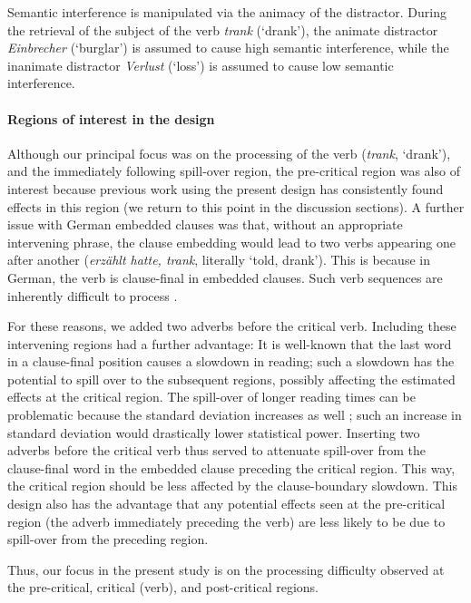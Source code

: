\documentclass[a4paper, man, floatsintext]{apa7}
\begin{document}
Semantic interference is manipulated via the animacy of the distractor. During the retrieval of the subject of the verb \textit{trank} (`drank'), the animate distractor  \textit{Einbrecher} (`burglar') is assumed to cause high semantic interference, while the inanimate distractor \textit{Verlust} (`loss') is assumed to cause low semantic interference. 

\paragraph{Regions of interest in the design}

Although our principal focus was on the processing of the verb (\textit{trank}, `drank'), and the immediately following spill-over region, the pre-critical region was also of interest because previous work using the present design \parencite{vandyke07,mertzen} has consistently found effects in this region (we return to this point in the discussion sections). A further issue with German embedded clauses \parencite[also see][]{mertzen} was that, without an appropriate intervening phrase, the clause embedding would lead to two verbs appearing one after another (\textit{erzählt hatte, trank}, literally `told, drank'). This is because in German, the verb is clause-final in embedded clauses. Such verb sequences are inherently difficult to process \parencite{VSLK11,bach1986crossed}. 

For these reasons, we added two adverbs before the critical verb. Including these intervening regions had a further advantage: 
It is well-known \parencite[e.g., ][]{rayner2000effect} that the last word in a clause-final position causes a slowdown in reading; such a slowdown has the potential to spill over to the subsequent regions, possibly affecting the estimated effects at the critical region. The spill-over of longer reading times can be problematic because the standard deviation increases as well \parencite{wagenmakers2007linear}; such an increase in standard deviation would drastically lower statistical power. 
Inserting two adverbs before the critical verb thus served to attenuate spill-over from the clause-final word in the embedded clause preceding the critical region. This way, the critical region should be less affected by the clause-boundary slowdown. This design also has the advantage that any potential effects seen at the pre-critical region (the adverb immediately preceding the verb) are less likely to be due to spill-over from the preceding region. 

Thus, our focus in the present study is on the processing difficulty observed at the pre-critical, critical (verb), and post-critical regions.
\end{document}
